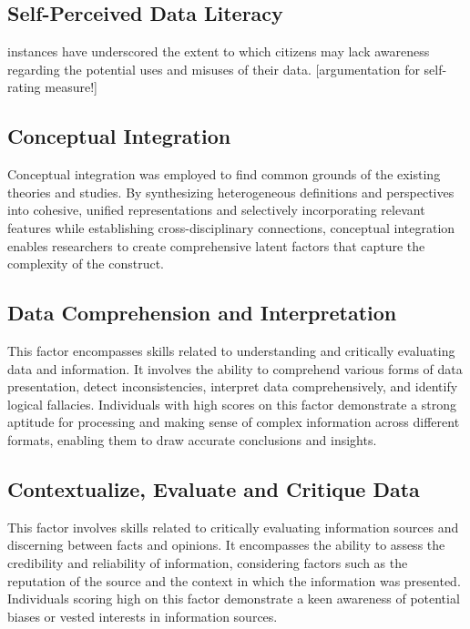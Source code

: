 \documentclass[
  12pt,
  a4paper,
  twoside]{article}
\begin{document}
\hypertarget{self-perceived-data-literacy}{%
\subsection{Self-Perceived Data Literacy}\label{self-perceived-data-literacy}}

instances have underscored the extent to which citizens may lack awareness regarding the potential uses and misuses of their data. {[}argumentation for self-rating measure!{]}

\hypertarget{conceptual-integration}{%
\subsection{Conceptual Integration}\label{conceptual-integration}}

Conceptual integration was employed to find common grounds of the existing theories and studies.
By synthesizing heterogeneous definitions and perspectives into cohesive, unified representations and selectively incorporating relevant features while establishing cross-disciplinary connections, conceptual integration enables researchers to create comprehensive latent factors that capture the complexity of the construct.

\hypertarget{data-comprehension-and-interpretation}{%
\subsection{Data Comprehension and Interpretation}\label{data-comprehension-and-interpretation}}

This factor encompasses skills related to understanding and critically evaluating data and information. It involves the ability to comprehend various forms of data presentation, detect inconsistencies, interpret data comprehensively, and identify logical fallacies. Individuals with high scores on this factor demonstrate a strong aptitude for processing and making sense of complex information across different formats, enabling them to draw accurate conclusions and insights.

\hypertarget{contextualize-evaluate-and-critique-data}{%
\subsection{Contextualize, Evaluate and Critique Data}\label{contextualize-evaluate-and-critique-data}}

This factor involves skills related to critically evaluating information sources and discerning between facts and opinions. It encompasses the ability to assess the credibility and reliability of information, considering factors such as the reputation of the source and the context in which the information was presented. Individuals scoring high on this factor demonstrate a keen awareness of potential biases or vested interests in information sources.
\end{document}
